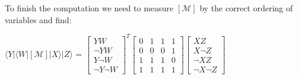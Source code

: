 \documentclass[10pt]{article}
\newcommand{\ket}[1]{$|{#1}\rangle$}
\newcommand{\bra}[1]{$\langle{#1}|$}
\begin{document}
To finish the computation we need to measure $[\mathcal{M}]$ by the correct ordering of variables and find:
\begin{center}
\bra{Y}\bra{W}$[\mathcal{M}]$\ket{X}\ket{Z} = $\begin{bmatrix} YW \\ \neg  Y W \\ Y\neg W \\ \neg Y \neg W \end{bmatrix}^T \begin{bmatrix} 0 & 1 & 1 & 1 \\ 0 & 0 & 0 & 1 \\ 1 & 1 & 1 & 0 \\ 1 & 1 & 1 & 1 \end{bmatrix}\begin{bmatrix} XZ \\ X \neg Z \\ \neg X Z \\ \neg X \neg Z \end{bmatrix}$
\end{center}
\end{document}
